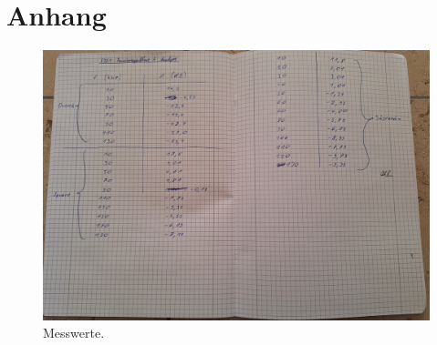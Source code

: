 \section{Anhang}
\label{sec:Anhang}

\begin{figure}
    \caption{Messwerte.}
    \centering
    \includegraphics[width=\textwidth]{"Bilder/mw.jpg"}
\end{figure}